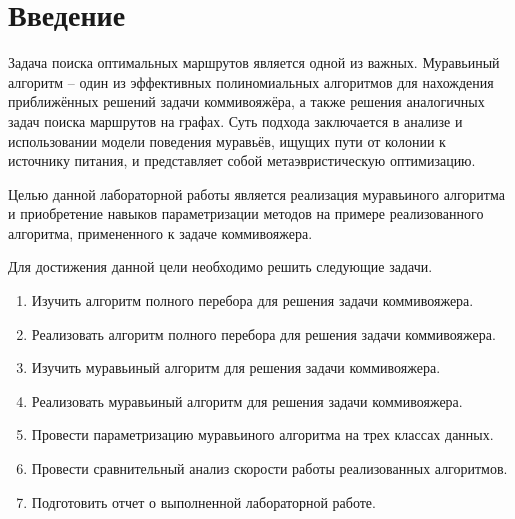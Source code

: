 \chapter*{Введение}

Задача поиска оптимальных маршрутов является одной из важных. Муравьиный алгоритм – один из эффективных полиномиальных алгоритмов для нахождения приближённых решений задачи коммивояжёра, а также решения аналогичных задач поиска маршрутов на графах. Суть подхода заключается в анализе и использовании модели поведения муравьёв, ищущих пути от колонии к источнику питания, и представляет собой метаэвристическую оптимизацию.

Целью данной лабораторной работы является реализация муравьиного алгоритма и приобретение навыков параметризации методов на примере реализованного алгоритма, примененного к задаче коммивояжера.

Для достижения данной цели необходимо решить следующие задачи.

\begin{enumerate}
	\item Изучить алгоритм полного перебора для решения задачи коммивояжера.
	\item Реализовать алгоритм полного перебора для решения задачи коммивояжера.
	\item Изучить муравьиный алгоритм для решения задачи коммивояжера.
	\item Реализовать муравьиный алгоритм для решения задачи коммивояжера.
	\item Провести параметризацию муравьиного алгоритма на трех классах данных.
	\item Провести сравнительный анализ скорости работы реализованных алгоритмов.
	\item Подготовить отчет о выполненной лабораторной работе.
\end{enumerate}